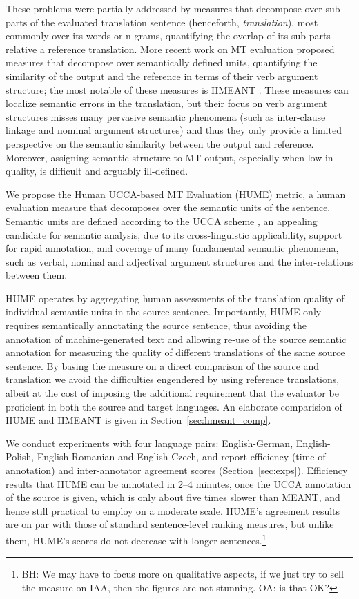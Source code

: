 \documentclass[11pt]{article}
\newcommand{\secref}[1]{Section~\ref{#1}}
\newcommand{\bh}[1]{\footnote{\color{blue}BH: #1}}
\begin{document}
These problems were partially addressed by measures that decompose over sub-parts of the evaluated
translation sentence (henceforth, {\it translation}),
most commonly over its words or n-grams,
quantifying the overlap of its sub-parts relative a reference translation.
More recent work on MT evaluation proposed measures
that decompose over semantically defined units,
quantifying the similarity of the output and the reference in terms of
their verb argument structure; the most notable of these measures is
HMEANT \cite{lo2011structured}.
These measures can localize semantic errors in the translation, but
their focus on verb argument structures misses many pervasive semantic phenomena
(such as inter-clause linkage and nominal argument structures) and thus they only provide
a limited perspective on the semantic similarity between the output and reference.
Moreover, assigning semantic structure to MT output, especially when low in quality,
is difficult and arguably ill-defined.

We propose the Human UCCA-based MT Evaluation (HUME) metric,
a human evaluation measure that decomposes over the semantic units of the sentence.
Semantic units are defined according to the 
UCCA scheme \cite{abend2013universal}, an appealing candidate for semantic analysis,
due to its cross-linguistic applicability, support for rapid annotation, and coverage
of many fundamental semantic phenomena, such as verbal, nominal and adjectival
argument structures and the inter-relations between them.

HUME operates by aggregating human assessments of the translation quality of individual
semantic units in the source sentence.
Importantly, HUME only requires semantically annotating the source sentence,
thus avoiding the annotation of machine-generated text 
and allowing re-use of the source semantic annotation for measuring the quality
of different translations of the same source sentence.
By basing the measure on a direct comparison
of the source and translation we avoid the difficulties engendered by using
reference translations, albeit at the cost of imposing the additional requirement
that the evaluator be proficient in both the source and target languages.
An elaborate comparision of HUME and HMEANT is given in \secref{sec:hmeant_comp}.

We conduct experiments with four language pairs: English-German, English-Polish,
English-Romanian and English-Czech, and report efficiency (time of annotation) and
inter-annotator agreement scores (\secref{sec:exps}). Efficiency results that HUME
can be annotated in 2--4 minutes, once the UCCA annotation of the source is given,
which is only about five times slower than MEANT, and hence still practical to
employ on a moderate scale. HUME's agreement results are on par with those
of standard sentence-level ranking measures, but unlike them,
HUME's scores do not decrease with longer sentences.\bh{We may
  have to focus more on qualitative aspects, if we just try to sell
  the measure on IAA, then the figures are not stunning. OA: is that OK?}
\end{document}

